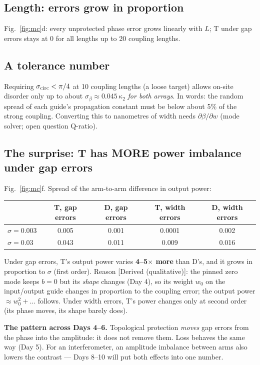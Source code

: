 \documentclass[10pt,a4paper]{article}
\newcommand{\kc}{\kappa_2}
\newcommand{\note}[1]{\par\smallskip\noindent\colorbox{gray!12}{\parbox{\dimexpr\linewidth-2\fboxsep}{\small #1}}\par\smallskip}
\newcommand{\evd}[1]{\textsf{\small[#1]}}
\begin{document}
\subsection{Length: errors grow in proportion}
Fig.~\ref{fig:mc}d: every unprotected phase error grows linearly with $L$; T under gap errors stays at 0 for all lengths up to 20 coupling lengths.

\subsection{A tolerance number}
Requiring $\sigma_{\rm circ}<\pi/4$ at 10 coupling lengths (a loose target) allows on-site disorder only up to about $\sigma_\beta\approx0.045\,\kc$ \emph{for both arrays}. In words: the random spread of each guide's propagation constant must be below about 5\% of the strong coupling. Converting this to nanometres of width needs $\partial\beta/\partial w$ (mode solver; open question Q-ratio).

\subsection{The surprise: T has MORE power imbalance under gap errors}
Fig.~\ref{fig:mc}f. Spread of the arm-to-arm difference in output power:\par\smallskip\noindent
\begin{tabular}{@{}lcccc@{}}\toprule
 & T, gap errors & D, gap errors & T, width errors & D, width errors\\\midrule
$\sigma=0.003$ & 0.005 & 0.001 & 0.0001 & 0.002\\
$\sigma=0.03$ & 0.043 & 0.011 & 0.009 & 0.016\\\bottomrule
\end{tabular}
\smallskip

Under gap errors, T's output power varies \textbf{4--5$\times$ more} than D's, and it grows in proportion to $\sigma$ (first order). Reason \evd{Derived (qualitative)}: the pinned zero mode keeps $b=0$ but its \emph{shape} changes (Day 4), so its weight $w_0$ on the input/output guide changes in proportion to the coupling error; the output power $\approx w_0^2+\dots$ follows. Under width errors, T's power changes only at second order (its phase moves, its shape barely does).
\note{\textbf{The pattern across Days 4--6.} Topological protection \emph{moves} gap errors from the phase into the amplitude: it does not remove them. Loss behaves the same way (Day 5). For an interferometer, an amplitude imbalance between arms also lowers the contrast --- Days 8--10 will put both effects into one number.}
\end{document}
